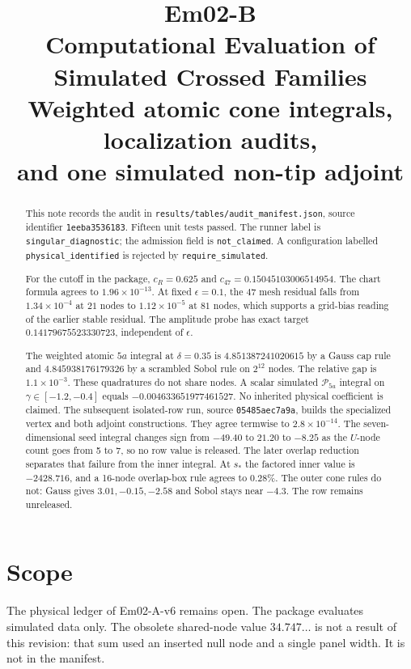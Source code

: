 \documentclass[11pt,letterpaper]{article}
\title{\textbf{Em02-B}\\[0.4em]
Computational Evaluation of Simulated Crossed Families\\[0.4em]
\large Weighted atomic cone integrals, localization audits,\\
and one simulated non-tip adjoint}
\author{}
\date{}
\numberwithin{equation}{section}
\theoremstyle{definition}
\begin{document}
\maketitle

\begin{abstract}
This note records the audit in
\texttt{results/tables/audit\_manifest.json},
source identifier \texttt{1eeba3536183}.
Fifteen unit tests passed.
The runner label is \texttt{singular\_diagnostic}; the admission
field is \texttt{not\_claimed}.
A configuration labelled \texttt{physical\_identified} is rejected
by \texttt{require\_simulated}.

For the cutoff in the package,
\(c_R=0.625\) and
\(c_{47}=0.15045103006514954\).
The chart formula agrees to \(1.96\times 10^{-13}\).
At fixed \(\epsilon=0.1\), the \(47\) mesh residual falls from
\(1.34\times 10^{-4}\) at \(21\) nodes to
\(1.12\times 10^{-5}\) at \(81\) nodes, which supports a grid-bias
reading of the earlier stable residual.
The amplitude probe has exact target
\(0.14179675523330723\), independent of \(\epsilon\).

The weighted atomic \(5a\) integral at \(\delta=0.35\) is
\(4.851387241020615\) by a Gauss cap rule and
\(4.845938176179326\) by a scrambled Sobol rule on \(2^{12}\) nodes.
The relative gap is \(1.1\times 10^{-3}\).
These quadratures do not share nodes.
A scalar simulated \(\mathscr P_{5a}\) integral on
\(\gamma\in[-1.2,-0.4]\) equals \(-0.004633651977461527\).
No inherited physical coefficient is claimed.
The subsequent isolated-row run, source \texttt{05485aec7a9a},
builds the specialized vertex and both adjoint constructions.
They agree termwise to \(2.8\times 10^{-14}\).
The seven-dimensional seed integral changes sign from
\(-49.40\) to \(21.20\) to \(-8.25\) as the \(U\)-node count goes
from 5 to 7, so no row value is released.
The later overlap reduction separates that failure from the inner
integral. At \(s_*\) the factored inner value is \(-2428.716\), and a
16-node overlap-box rule agrees to \(0.28\%\). The outer cone rules
do not: Gauss gives \(3.01,-0.15,-2.58\) and Sobol stays near \(-4.3\).
The row remains unreleased.
\end{abstract}

\tableofcontents

\section{Scope}
The physical ledger of Em02-A-v6 remains open.
The package evaluates simulated data only.
The obsolete shared-node value \(34.747\ldots\) is not a result of
this revision: that sum used an inserted null node and a single
panel width. It is not in the manifest.
\end{document}
